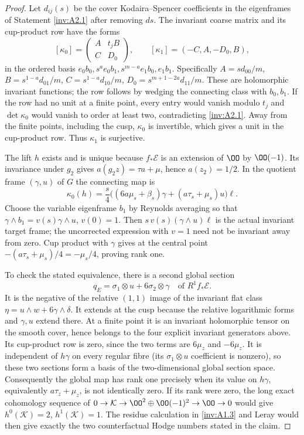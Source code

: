 \begin{proof}
Let $d_{ij}(s)$ be the cover Kodaira--Spencer coefficients in the
eigenframes of Statement \ref{inv:A2.1} after removing $ds$.
The invariant coarse matrix and its cup-product row have the forms
\[
[\kappa_0]=\begin{pmatrix}A&t_jB\\C&D_0\end{pmatrix},\qquad
[\kappa_1]=(-C,A,-D_0,B),
\]
in the ordered basis
$e_0b_0,s^ae_0b_1,s^{m-a}e_1b_0,e_1b_1$.  Specifically
$A=sd_{00}/m$, $B=s^{1-a}d_{01}/m$,
$C=s^{1-a}d_{10}/m$, $D_0=s^{m+1-2a}d_{11}/m$.
These are holomorphic invariant functions; the row follows by
wedging the connecting class with $b_0,b_1$.
If the row had no unit at a finite point, every entry would vanish
modulo $t_j$ and $\det\kappa_0$ would vanish to order at least two,
contradicting \ref{inv:A2.1}.  Away from the finite points, including the cusp,
$\kappa_0$ is invertible, which gives a unit in the cup-product row.
Thus $\kappa_1$ is surjective.

The lift $h$ exists and is unique because $f_*\mathcal E$ is an
extension of $\OO$ by $\OO(-1)$.  Its invariance under $g_2$ gives
$a(g_2z)=\tau a+\mu$, hence $a(z_2)=1/2$.
In the quotient frame $(\gamma,u)$ of $G$ the connecting map is
\[
\kappa_0(h)=\frac{s}{4}
\bigl((6a\mu_s+\beta_s)\gamma+(a\tau_s+\mu_s)u\bigr)\ell.
\]
Choose the variable eigenframe $b_1$ by Reynolds averaging so that
$\gamma\wedge b_1=v(s)\gamma\wedge u$, $v(0)=1$.
Then $s\,v(s)(\gamma\wedge u)\ell$ is the actual invariant
target frame; the uncorrected expression with $v=1$ need not be
invariant away from zero.  Cup product with $\gamma$ gives at the
central point $-(a\tau_s+\mu_s)/4=-\mu_s/4$, proving rank one.

To check the stated equivalence, there is a second global section
\[
q_E=\sigma_1\otimes u+6\sigma_2\otimes\gamma
\quad\text{of }R^1f_*\mathcal E.
\]
It is the negative of the relative $(1,1)$ image of the invariant
flat class $\eta=u\wedge w+6\gamma\wedge\delta$.
It extends at the cusp because the relative logarithmic forms and
$\gamma,u$ extend there.  At a finite point it is an invariant
holomorphic tensor on the smooth cover, hence belongs to the four
explicit invariant generators above.  Its cup-product row is zero,
since the two terms are $6\mu_z$ and $-6\mu_z$.
It is independent of $h\gamma$ on every regular fibre (its
$\sigma_1\otimes u$ coefficient is nonzero), so these two sections
form a basis of the two-dimensional global section space.
Consequently the global map has rank one precisely when its value
on $h\gamma$, equivalently $a\tau_z+\mu_z$, is not identically
zero.  If its rank were zero, the long exact cohomology sequence of
$0\to\mathcal K\to\OO^2\oplus\OO(-1)^2\to\OO\to0$
would give $h^0(\mathcal K)=2$, $h^1(\mathcal K)=1$.
The residue calculation in \ref{inv:A1.3} and Leray would then give exactly
the two counterfactual Hodge numbers stated in the claim.
\end{proof}

